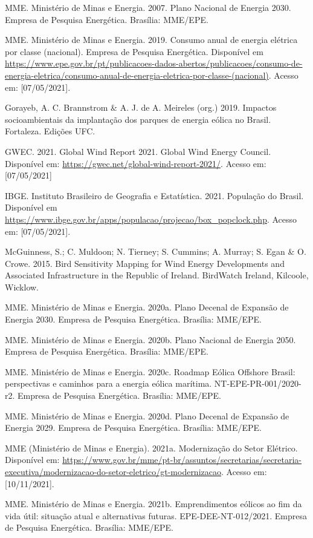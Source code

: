 \documentclass[
  oneside]{scrbook}
\begin{document}
MME. Ministério de Minas e Energia. 2007. Plano Nacional de Energia 2030. Empresa de Pesquisa Energética. Brasília: MME/EPE.

MME. Ministério de Minas e Energia. 2019. Consumo anual de energia elétrica por classe (nacional). Empresa de Pesquisa Energética. Disponível em \url{https://www.epe.gov.br/pt/publicacoes-dados-abertos/publicacoes/consumo-de-energia-eletrica/consumo-anual-de-energia-eletrica-por-classe-(nacional)}. Acesso em: {[}07/05/2021{]}.

Gorayeb, A. C. Brannstrom \& A. J. de A. Meireles (org.) 2019. Impactos socioambientais da implantação dos parques de energia eólica no Brasil. Fortaleza. Edições UFC.

GWEC. 2021. Global Wind Report 2021. Global Wind Energy Council. Disponível em: \url{https://gwec.net/global-wind-report-2021/}. Acesso em: {[}07/05/2021{]}

IBGE. Instituto Brasileiro de Geografia e Estatística. 2021. População do Brasil. Disponível em \url{https://www.ibge.gov.br/apps/populacao/projecao/box_popclock.php}. Acesso em: {[}07/05/2021{]}.

McGuinness, S.; C. Muldoon; N. Tierney; S. Cummins; A. Murray; S. Egan \& O. Crowe. 2015. Bird Sensitivity Mapping for Wind Energy Developments and Associated Infrastructure in the Republic of Ireland. BirdWatch Ireland, Kilcoole, Wicklow.

MME. Ministério de Minas e Energia. 2020a. Plano Decenal de Expansão de Energia 2030. Empresa de Pesquisa Energética. Brasília: MME/EPE.

MME. Ministério de Minas e Energia. 2020b. Plano Nacional de Energia 2050. Empresa de Pesquisa Energética. Brasília: MME/EPE.

MME. Ministério de Minas e Energia. 2020c. Roadmap Eólica Offshore Brasil: perspectivas e caminhos para a energia eólica marítima. NT-EPE-PR-001/2020-r2. Empresa de Pesquisa Energética. Brasília: MME/EPE.

MME. Ministério de Minas e Energia. 2020d. Plano Decenal de Expansão de Energia 2029. Empresa de Pesquisa Energética. Brasília: MME/EPE.

MME (Ministério de Minas e Energia). 2021a. Modernização do Setor Elétrico. Disponível em: \url{https://www.gov.br/mme/pt-br/assuntos/secretarias/secretaria-executiva/modernizacao-do-setor-eletrico/gt-modernizacao}. Acesso em: {[}10/11/2021{]}.

MME. Ministério de Minas e Energia. 2021b. Emprendimentos eólicos ao fim da vida útil: situação atual e alternativas futuras. EPE-DEE-NT-012/2021. Empresa de Pesquisa Energética. Brasília: MME/EPE.
\end{document}
